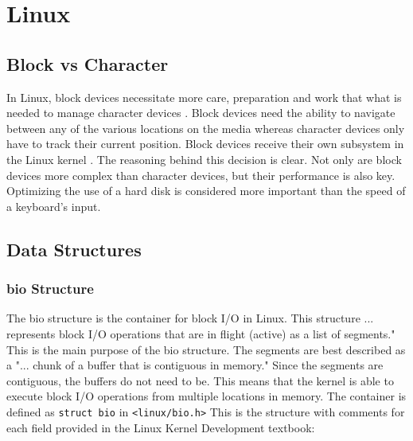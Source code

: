 \section{Linux}

\subsection{Block vs Character}
In Linux, block devices necessitate more care, preparation and work that what is needed to manage character devices \cite{LinuxTextbook}. Block devices need the ability to navigate between any of the various locations on the media whereas character devices only have to track their current position\cite{LinuxTextbook}. Block devices receive their own subsystem in the Linux kernel \cite{LinuxTextbook}. The reasoning behind this decision is clear. Not only are block devices more complex than character devices, but their performance is also key. Optimizing the use of a hard disk is considered more important than the speed of a keyboard's input.

\subsection{Data Structures}

\subsubsection{bio Structure}
The bio structure is the container for block I/O in Linux. This structure ... represents block I/O operations that are in flight (active) as a list of segments." \cite{LinuxTextbook} This is the main purpose of the bio structure. The segments are best described as a "... chunk of a buffer that is contiguous in memory." \cite{LinuxTextbook} Since the segments are contiguous, the buffers do not need to be. This means that the kernel is able to execute block I/O operations from multiple locations in memory. The container is defined as \lstinline{struct bio} in \lstinline{<linux/bio.h>} This is the structure with comments for each field provided in the Linux Kernel Development textbook:

